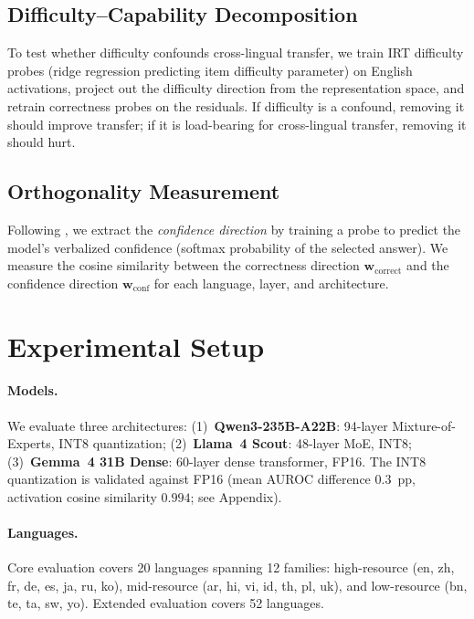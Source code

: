 \documentclass[11pt,a4paper]{article}
\begin{document}
\subsection{Difficulty--Capability Decomposition}

To test whether difficulty confounds cross-lingual transfer, we train IRT difficulty probes (ridge regression predicting item difficulty parameter) on English activations, project out the difficulty direction from the representation space, and retrain correctness probes on the residuals.
If difficulty is a confound, removing it should improve transfer; if it is load-bearing for cross-lingual transfer, removing it should hurt.

\subsection{Orthogonality Measurement}

Following \citet{miao-ungar-2026}, we extract the \emph{confidence direction} by training a probe to predict the model's verbalized confidence (softmax probability of the selected answer).
We measure the cosine similarity between the correctness direction $\mathbf{w}_\text{correct}$ and the confidence direction $\mathbf{w}_\text{conf}$ for each language, layer, and architecture.

\section{Experimental Setup}

\paragraph{Models.}
We evaluate three architectures:
(1)~\textbf{Qwen3-235B-A22B}: 94-layer Mixture-of-Experts, INT8 quantization;
(2)~\textbf{Llama~4 Scout}: 48-layer MoE, INT8;
(3)~\textbf{Gemma~4 31B Dense}: 60-layer dense transformer, FP16.
The INT8 quantization is validated against FP16 (mean AUROC difference $0.3$~pp, activation cosine similarity $0.994$; see Appendix).

\paragraph{Languages.}
Core evaluation covers 20 languages spanning 12 families: high-resource (en, zh, fr, de, es, ja, ru, ko), mid-resource (ar, hi, vi, id, th, pl, uk), and low-resource (bn, te, ta, sw, yo).
Extended evaluation covers 52 languages.
\end{document}
